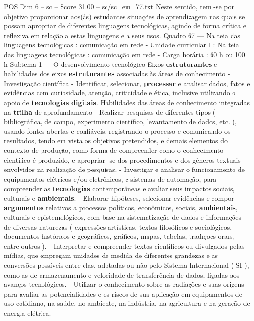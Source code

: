 \begin{textsample}{POS Dim 6 – sc – Score 31.00 – sc/sc\_em\_77.txt}
Neste sentido, tem -se por objetivo proporcionar aos(às) estudantes situações de aprendizagem nas quais se possam apropriar de diferentes linguagens tecnológicas, agindo de forma crítica e reflexiva em relação a estas linguagens e a seus usos.
Quadro 67 — Na teia das linguagens tecnológicas : comunicação em rede - Unidade curricular I : Na teia das linguagens tecnológicas : comunicação em rede - Carga horária : 60 h ou 100 h Subtema 1 — O desenvolvimento tecnológico Eixos \textbf{estruturantes} e habilidades dos eixos \textbf{estruturantes} associadas às áreas de conhecimento - Investigação científica - Identificar, selecionar, \textbf{processar} e analisar dados, fatos e evidências com curiosidade, atenção, criticidade e ética, inclusive utilizando o apoio de \textbf{tecnologias} \textbf{digitais}.
Habilidades das áreas de conhecimento integradas na \textbf{trilha} de aprofundamento - Realizar pesquisas de diferentes tipos ( bibliográfica, de campo, experimento científico, levantamento de dados, etc. ), usando fontes abertas e confiáveis, registrando o processo e comunicando os resultados, tendo em vista os objetivos pretendidos, e demais elementos do contexto de produção, como forma de compreender como o conhecimento científico é produzido, e apropriar -se dos procedimentos e dos gêneros textuais envolvidos na realização de pesquisas. - Investigar e analisar o funcionamento de equipamentos elétricos e/ou eletrônicos, e sistemas de automação, para compreender as \textbf{tecnologias} contemporâneas e avaliar seus impactos sociais, culturais e \textbf{ambientais}. - Elaborar hipóteses, selecionar evidências e compor \textbf{argumentos} relativos a processos políticos, econômicos, sociais, \textbf{ambientais}, culturais e epistemológicos, com base na sistematização de dados e informações de diversas naturezas ( expressões artísticas, textos filosóficos e sociológicos, documentos históricos e geográficos, gráficos, mapas, tabelas, tradições orais, entre outros ). - Interpretar e compreender textos científicos ou divulgados pelas mídias, que empregam unidades de medida de diferentes grandezas e as conversões possíveis entre elas, adotadas ou não pelo Sistema Internacional ( SI ), como as de armazenamento e velocidade de transferência de dados, ligadas aos avanços tecnológicos. - Utilizar o conhecimento sobre as radiações e suas origens para avaliar as potencialidades e os riscos de sua aplicação em equipamentos de uso cotidiano, na saúde, no ambiente, na indústria, na agricultura e na geração de energia elétrica.

\end{textsample}
